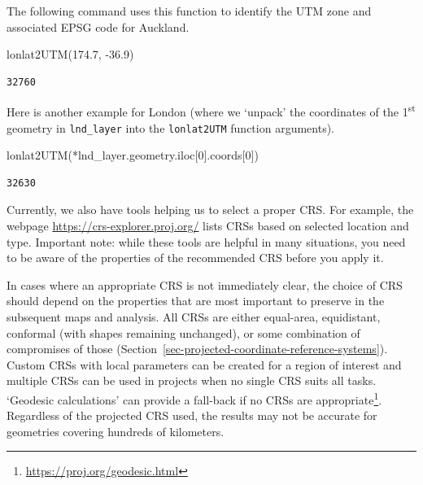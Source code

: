 \documentclass[
  letterpaper,
]{krantz}
\newenvironment{Shaded}{\begin{snugshade}}{\end{snugshade}}
\newcommand{\DecValTok}[1]{\textcolor[rgb]{0.68,0.00,0.00}{#1}}
\newcommand{\FloatTok}[1]{\textcolor[rgb]{0.68,0.00,0.00}{#1}}
\newcommand{\NormalTok}[1]{\textcolor[rgb]{0.00,0.23,0.31}{#1}}
\newcommand{\OperatorTok}[1]{\textcolor[rgb]{0.37,0.37,0.37}{#1}}
\begin{document}
The following command uses this function to identify the UTM zone and
associated EPSG code for Auckland.

\begin{Shaded}
\begin{Highlighting}[]
\NormalTok{lonlat2UTM(}\FloatTok{174.7}\NormalTok{, }\OperatorTok{{-}}\FloatTok{36.9}\NormalTok{)}
\end{Highlighting}
\end{Shaded}

\begin{verbatim}
32760
\end{verbatim}

Here is another example for London (where we `unpack' the coordinates of
the 1\textsuperscript{st} geometry in \texttt{lnd\_layer} into the
\texttt{lonlat2UTM} function arguments).

\begin{Shaded}
\begin{Highlighting}[]
\NormalTok{lonlat2UTM(}\OperatorTok{*}\NormalTok{lnd\_layer.geometry.iloc[}\DecValTok{0}\NormalTok{].coords[}\DecValTok{0}\NormalTok{])}
\end{Highlighting}
\end{Shaded}

\begin{verbatim}
32630
\end{verbatim}

Currently, we also have tools helping us to select a proper CRS. For
example, the webpage \url{https://crs-explorer.proj.org/} lists CRSs
based on selected location and type. Important note: while these tools
are helpful in many situations, you need to be aware of the properties
of the recommended CRS before you apply it.

In cases where an appropriate CRS is not immediately clear, the choice
of CRS should depend on the properties that are most important to
preserve in the subsequent maps and analysis. All CRSs are either
equal-area, equidistant, conformal (with shapes remaining unchanged), or
some combination of compromises of those
(Section~\ref{sec-projected-coordinate-reference-systems}). Custom CRSs
with local parameters can be created for a region of interest and
multiple CRSs can be used in projects when no single CRS suits all
tasks. `Geodesic calculations' can provide a fall-back if no CRSs are
appropriate\footnote{\url{https://proj.org/geodesic.html}}. Regardless
of the projected CRS used, the results may not be accurate for
geometries covering hundreds of kilometers.
\end{document}
